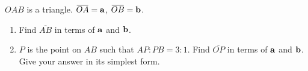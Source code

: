 \begin{enumerate}
\begin{figure}[H]
  \end{figure}
  $OAB$ is a triangle. $\overbar{OA} = \vb{a}$, $\overbar{OB} = \vb{b}$.
  \begin{enumerate}
    \item Find $\overbar{AB}$ in terms of $\vb{a}$ and $\vb{b}$.\\[2cm]\vspace*{0pt}\hfill\dline
    \item $P$ is the point on $AB$ such that $AP : PB = 3 : 1$. Find $\overbar{OP}$ in terms of $\vb{a}$ and $\vb{b}$. Give your answer in its simplest form.\\[4cm]\vspace*{0pt}\hfill\dline
  \end{enumerate}
  




\end{enumerate}